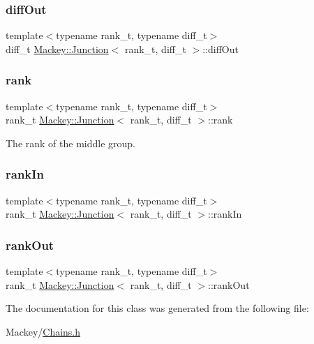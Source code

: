 \subsubsection{\texorpdfstring{diff\+Out}{diffOut}}
{\footnotesize\ttfamily template$<$typename rank\+\_\+t, typename diff\+\_\+t$>$ \\
diff\+\_\+t \hyperlink{classMackey_1_1Junction}{Mackey\+::\+Junction}$<$ rank\+\_\+t, diff\+\_\+t $>$\+::diff\+Out}

\mbox{\label{classMackey_1_1Junction_a70d63a0f6ad20b052210ab0009815a9e}} 
\subsubsection{\texorpdfstring{rank}{rank}}
{\footnotesize\ttfamily template$<$typename rank\+\_\+t, typename diff\+\_\+t$>$ \\
rank\+\_\+t \hyperlink{classMackey_1_1Junction}{Mackey\+::\+Junction}$<$ rank\+\_\+t, diff\+\_\+t $>$\+::rank}



The rank of the middle group. 

\mbox{\label{classMackey_1_1Junction_a6174a3bef929f4b5b892d3b7ccb20528}} 
\subsubsection{\texorpdfstring{rank\+In}{rankIn}}
{\footnotesize\ttfamily template$<$typename rank\+\_\+t, typename diff\+\_\+t$>$ \\
rank\+\_\+t \hyperlink{classMackey_1_1Junction}{Mackey\+::\+Junction}$<$ rank\+\_\+t, diff\+\_\+t $>$\+::rank\+In}

\mbox{\label{classMackey_1_1Junction_afe400bc60b84966b933fd57c11400607}} 
\subsubsection{\texorpdfstring{rank\+Out}{rankOut}}
{\footnotesize\ttfamily template$<$typename rank\+\_\+t, typename diff\+\_\+t$>$ \\
rank\+\_\+t \hyperlink{classMackey_1_1Junction}{Mackey\+::\+Junction}$<$ rank\+\_\+t, diff\+\_\+t $>$\+::rank\+Out}



The documentation for this class was generated from the following file\+:\begin{DoxyCompactItemize}
\item 
Mackey/\hyperlink{Chains_8h}{Chains.\+h}\end{DoxyCompactItemize}
